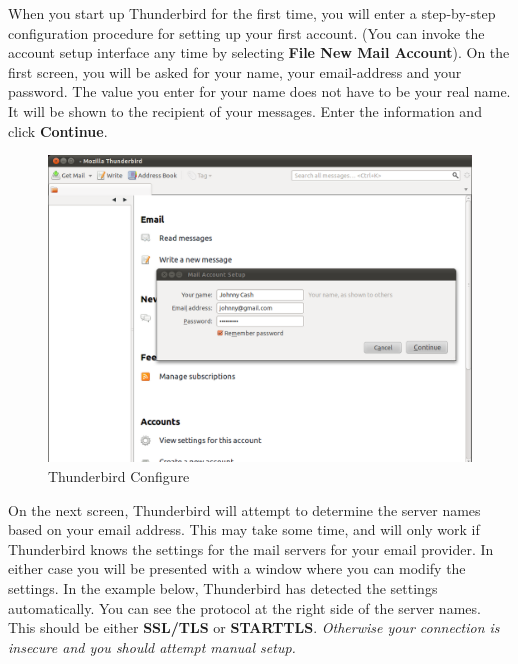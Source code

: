 When you start up Thunderbird for the first time, you will enter a
step-by-step configuration procedure for setting up your first account.
(You can invoke the account setup interface any time by selecting
\textbf{File \textbar{} New \textbar{} Mail Account}). On the first
screen, you will be asked for your name, your email-address and your
password. The value you enter for your name does not have to be your
real name. It will be shown to the recipient of your messages. Enter the
information and click \textbf{Continue}.

\begin{figure}[htbp]
\centering
\includegraphics{thunderbird_conf_1.png}
\caption{Thunderbird Configure}
\end{figure}

On the next screen, Thunderbird will attempt to determine the server
names based on your email address. This may take some time, and will
only work if Thunderbird knows the settings for the mail servers for
your email provider. In either case you will be presented with a window
where you can modify the settings. In the example below, Thunderbird has
detected the settings automatically. You can see the protocol at the
right side of the server names. This should be either \textbf{SSL/TLS}
or \textbf{STARTTLS}. \emph{Otherwise your connection is insecure and
you should attempt manual setup.}

